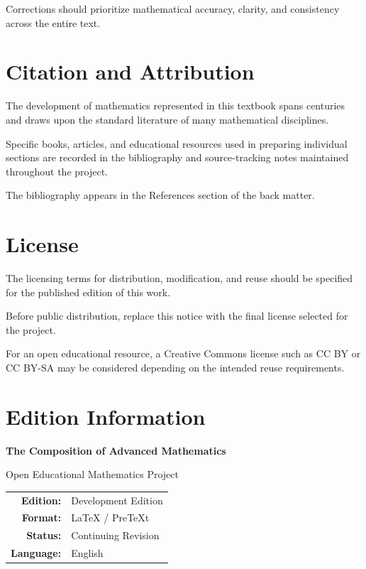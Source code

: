 Corrections should prioritize mathematical accuracy, clarity,
and consistency across the entire text.

\section*{Citation and Attribution}

The development of mathematics represented in this textbook spans
centuries and draws upon the standard literature of many mathematical
disciplines.

Specific books, articles, and educational resources used in preparing
individual sections are recorded in the bibliography and source-tracking
notes maintained throughout the project.

The bibliography appears in the References section of the back matter.

\section*{License}

The licensing terms for distribution, modification, and reuse should be
specified for the published edition of this work.

\begin{importantbox}
Before public distribution, replace this notice with the final license
selected for the project.

For an open educational resource, a Creative Commons license such as
CC BY or CC BY-SA may be considered depending on the intended reuse
requirements.
\end{importantbox}

\section*{Edition Information}

\begin{center}

\textbf{\Large The Composition of Advanced Mathematics}

\vspace{0.5em}

Open Educational Mathematics Project

\vspace{1em}

\begin{tabular}{rl}
\textbf{Edition:} & Development Edition \\[0.3em]
\textbf{Format:} & \LaTeX{} / PreTeXt \\[0.3em]
\textbf{Status:} & Continuing Revision \\[0.3em]
\textbf{Language:} & English
\end{tabular}

\end{center}

